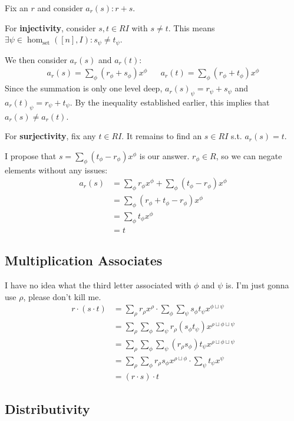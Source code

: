 \documentclass[12pt]{article}
\begin{document}
Fix an $r$ and consider $a_r(s): r+s$.

For \textbf{injectivity}, consider $s, t \in RI$ with $s \ne t$.
This means $\exists \psi \in \hom_{\text{set}}([n], I): s_\psi \ne t_\psi$.

We then consider $a_r(s)$ and $a_r(t)$:
\begin{align*}
  a_r(s)=\sum_{\phi} (r_\phi+s_\phi)x^\phi &&
  a_r(t)=\sum_{\phi} (r_\phi+t_\phi)x^\phi
\end{align*}
Since the summation is only one level deep, $a_r(s)_\psi=r_\psi+s_\psi$ and $a_r(t)_\psi=r_\psi+t_\psi$.
By the inequality established earlier, this implies that $a_r(s) \ne a_r(t)$.

For \textbf{surjectivity}, fix any $t \in RI$.
It remains to find an $s \in RI$ s.t. $a_r(s)=t$.

I propose that $s=\sum_{\phi} (t_\phi-r_\phi)x^\phi$ is our answer.
$r_\phi \in R$, so we can negate elements without any issues:
\begin{align*}
  a_r(s)
  &= \sum_{\phi} r_\phi x^\phi + \sum_{\phi} (t_\phi-r_\phi)x^\phi \\
  &= \sum_{\phi} (r_\phi+t_\phi-r_\phi)x^\phi \\
  &= \sum_{\phi} t_\phi x^\phi \\
  &= t
\end{align*}

\subsection{Multiplication Associates}

I have no idea what the third letter associated with $\phi$ and $\psi$ is.
I'm just gonna use $\rho$, please don't kill me.
\begin{align*}
  r \cdot (s \cdot t)
  &= \sum_{\rho} r_\rho x^\rho \cdot \sum_{\phi} \sum_{\psi} s_\phi t_\psi x^{\phi \sqcup \psi} \\
  &= \sum_{\rho} \sum_{\phi} \sum_{\psi} r_\rho (s_\phi t_\psi) x^{\rho \sqcup \phi \sqcup \psi} \\
  &= \sum_{\rho} \sum_{\phi} \sum_{\psi} (r_\rho s_\phi) t_\psi x^{\rho \sqcup \phi \sqcup \psi} \\
  &= \sum_{\rho} \sum_{\phi} r_\rho s_\phi x^{\rho \sqcup \phi} \cdot \sum_{\psi} t_\psi x^\psi \\
  &= (r \cdot s) \cdot t
\end{align*}

\subsection{Distributivity}
\end{document}
